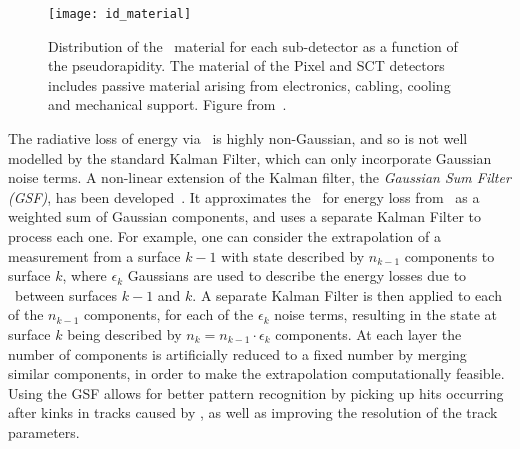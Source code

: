 \begin{figure}[h]
\centering
            \texttt{[image: id\_material]}
\caption[Distribution of the \id\ material for each sub-detector as a
function of the pseudorapidity.]{
Distribution of the \id\ material for each sub-detector as a
function of the pseudorapidity. The material of the Pixel and SCT detectors
includes passive material arising from electronics, cabling, cooling and
mechanical support. Figure from~\cite{ATLAS-CONF-2012-047}.}
\label{fig:id-material}
\end{figure}


The radiative loss of energy via \brem\ is highly non-Gaussian, and so is not
well modelled by the standard Kalman Filter, which can only incorporate Gaussian
noise terms. A non-linear extension of the
Kalman filter, the {\it Gaussian Sum Filter (GSF)}, has been
developed~\cite{Fruhwirth2003131,Atkinson:1448253}. It
approximates the \probDF\ for energy loss from \brem\ as a weighted sum of Gaussian
components, and uses a separate Kalman Filter to process each one. For example,
one can consider the extrapolation of a measurement from a surface $k-1$ with state
described by $n_{k-1}$ components to surface $k$, where $\epsilon_{k}$ Gaussians
are used to describe the energy losses due to \brem\ between surfaces $k-1$ and
$k$. A separate Kalman Filter is then applied to each of the $n_{k-1}$
components, for each of the $\epsilon_{k}$ noise terms, resulting in the state at
surface $k$ being described by $n_{k} = n_{k-1} \cdot \epsilon_{k}$ components.
At each layer the number of components is artificially reduced to a fixed number
by merging similar components,
in order to make the extrapolation computationally feasible.
Using the GSF allows for better pattern recognition by picking up hits
occurring after kinks in tracks caused by \brem, as well as improving the
resolution of the track parameters.


